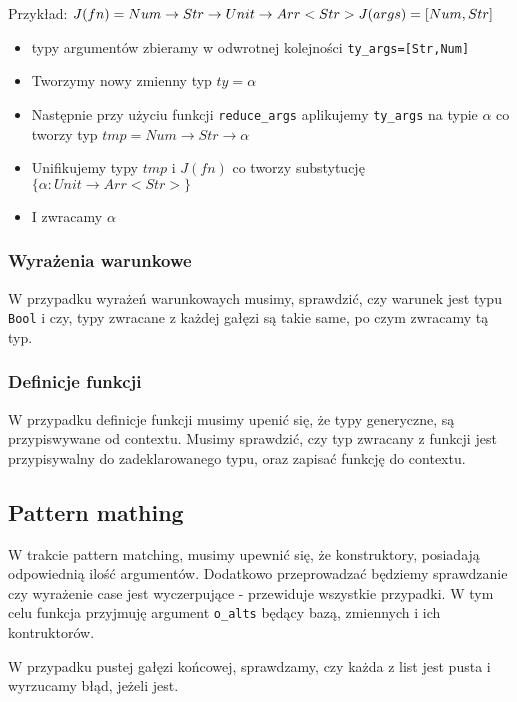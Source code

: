 \documentclass{article}
\begin{document}
Przykład: $J(fn)=Num\rightarrow Str\rightarrow Unit\rightarrow Arr<Str>\\ J(args)=[Num,Str]$
\begin{itemize}
  \item typy argumentów zbieramy w odwrotnej kolejności \lstinline{ty_args=[Str,Num]}
  \item Tworzymy nowy zmienny typ $ty=\alpha$
  \item Następnie przy użyciu funkcji \lstinline{reduce_args} aplikujemy \lstinline{ty_args} na typie $\alpha$ co tworzy typ $tmp=Num\rightarrow Str\rightarrow \alpha$
  \item Unifikujemy typy $tmp$ i $J(fn)$ co tworzy substytucję $\{\alpha: Unit\rightarrow Arr<Str>\}$
  \item I zwracamy $\alpha$
\end{itemize}


\subsubsection{Wyrażenia warunkowe}
W przypadku wyrażeń warunkowaych musimy, sprawdzić, czy warunek jest typu \lstinline{Bool} i czy, typy zwracane z każdej gałęzi są takie same, po czym zwracamy tą typ.


\subsubsection{Definicje funkcji}
W przypadku definicje funkcji musimy upenić się, że typy generyczne, są przypiswywane od contextu. Musimy sprawdzić, czy typ zwracany z funkcji jest przypisywalny do zadeklarowanego typu, oraz zapisać funkcję do contextu.


\subsection{Pattern mathing}
W trakcie pattern matching, musimy upewnić się, że konstruktory, posiadają odpowiednią ilość argumentów. Dodatkowo przeprowadzać będziemy sprawdzanie czy wyrażenie case jest wyczerpujące - przewiduje wszystkie przypadki. W tym celu funkcja przyjmuję argument \lstinline{o_alts} będący bazą, zmiennych i ich kontruktorów.

W przypadku pustej gałęzi końcowej, sprawdzamy, czy każda z list jest pusta i wyrzucamy błąd, jeżeli jest.

\end{document}
